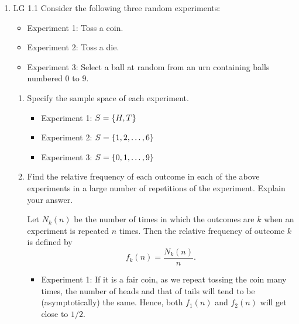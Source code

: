


%

\usepackage{fullpage}
\usepackage{fancyhdr}

\usepackage{graphicx}

\pagestyle{fancy}

\addtolength{\headsep}{.5cm}




\renewcommand{\emph}[1]{{\it #1}}


\setlength{\headheight}{15pt}
\maketitle
\begin{enumerate}
	\item LG 1.1
	\ifdefined\sol
	Consider the following three random experiments:
	\begin{itemize}
		\item Experiment 1: Toss a coin.
		\item Experiment 2: Toss a die.
		\item Experiment 3:
		Select a ball at random from an urn containing balls numbered $0$ to $9$.
	\end{itemize}
	\begin{enumerate}
		\item Specify the sample space of each experiment.
		\begin{solution}
			\begin{itemize}
				\item Experiment 1: $S = \{H,T\}$
				\item Experiment 2: $S = \{1,2,\ldots,6\}$
				\item Experiment 3: $S = \{0,1,\ldots,9\}$
			\end{itemize}
		\end{solution}

		\item Find the relative frequency of each outcome
		in each of the above experiments
		in a large number of repetitions of the experiment. Explain your answer.
		\begin{solution}
			Let $N_k(n)$ be the number of times in which the outcomes are $k$
			when an experiment is repeated $n$ times.
			Then the relative frequency of outcome $k$ is defined by
			\[
				f_k(n) = \frac{N_k(n)}{n}.
			\]
			\begin{itemize}
				\item Experiment 1:
				If it is a fair coin,
				as we repeat tossing the coin many times,
				the number of heads and that of tails
				will tend to be (asymptotically) the same.
				Hence, both $f_1(n)$ and $f_2(n)$ will get close to $1/2$.


\end{itemize}
\end{solution}
\end{enumerate}
\end{enumerate}
